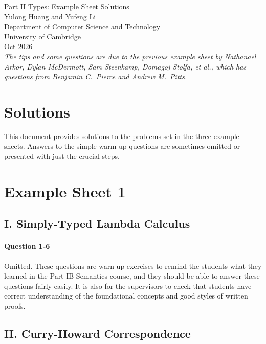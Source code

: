 \documentclass[11pt,a4paper,twoside]{article}
\begin{document}
\begin{center}
  {\Huge Part II Types: Example Sheet Solutions}\\
  \vspace{1.0em}
  {\large Yulong Huang and Yufeng Li}\\
  \vspace{0.5em}
  {\small Department of Computer Science and Technology \\ University
  of Cambridge \\ Oct 2026}\\
  \vspace{1.0em}
  \small{\textit{The tips and some questions are due to the previous
      example sheet by Nathanael Arkor, Dylan McDermott, Sam  Steenkamp,
      Domagoj Stolfa, et al., which has questions from Benjamin C.~Pierce
  and Andrew M.~Pitts.}}
\end{center}

\section*{Solutions}

This document provides solutions to the problems set in the three example sheets.
Answers to the simple warm-up questions are sometimes omitted or presented with
just the crucial steps.

\section*{Example Sheet 1}

\subsection*{I. Simply-Typed Lambda Calculus}

\paragraph{Question 1-6} Omitted. These questions are warn-up exercises to remind
the students what they learned in the Part IB Semantics course, and they should be 
able to answer these questions fairly easily. It is also for the supervisors to check
that students have correct understanding of the foundational concepts and good 
styles of written proofs.

\subsection*{II. Curry-Howard Correspondence}
\end{document}
